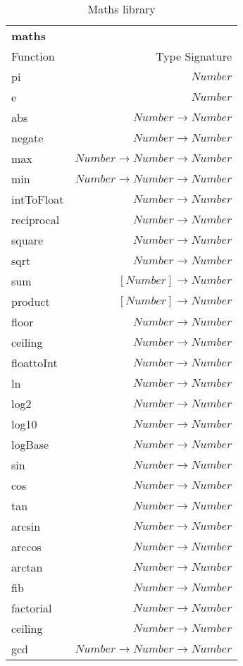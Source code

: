 \begin{table}
    \begin{tabular}{l r}
    \rowcolor{light-gray}
        \textbf{maths} & \\
        Function & Type Signature \\
        \hline
        pi & $Number$ \\
        e & $Number$ \\
        abs & $Number \rightarrow Number$ \\
        negate & $Number \rightarrow Number$ \\
        max & $Number \rightarrow Number \rightarrow Number$ \\
        min & $Number \rightarrow Number \rightarrow Number$ \\
        intToFloat & $Number \rightarrow Number$ \\
        reciprocal & $Number \rightarrow Number$ \\
        square & $Number \rightarrow Number$ \\
        sqrt & $Number \rightarrow Number$ \\
        sum & $[Number] \rightarrow Number$ \\
        product & $[Number] \rightarrow Number$ \\
        floor & $Number \rightarrow Number$ \\
        ceiling & $Number \rightarrow Number$ \\
        floattoInt & $Number \rightarrow Number$ \\
        ln & $Number \rightarrow Number$ \\
        log2 & $Number \rightarrow Number$ \\
        log10 & $Number \rightarrow Number$ \\
        logBase & $Number \rightarrow Number$ \\
        sin & $Number \rightarrow Number$ \\
        cos & $Number \rightarrow Number$ \\
        tan & $Number \rightarrow Number$ \\
        arcsin & $Number \rightarrow Number$ \\
        arccos & $Number \rightarrow Number$ \\
        arctan & $Number \rightarrow Number$ \\
        fib & $Number \rightarrow Number$ \\
        factorial & $Number \rightarrow Number$ \\
        ceiling & $Number \rightarrow Number$ \\
        gcd & $Number \rightarrow Number \rightarrow Number$ \\
    \end{tabular}
    \caption{Maths library}
\label{table:maths}
\end{table}

